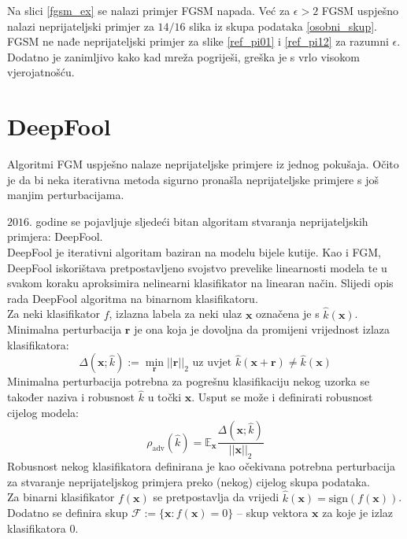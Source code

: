 \documentclass[utf8, diplomski]{fer}
\begin{document}
Na slici \ref{fgsm_ex} se nalazi primjer FGSM napada. Već za $\epsilon > 2$ FGSM uspješno nalazi neprijateljski primjer za $14/16$ slika iz skupa podataka \ref{osobni_skup}. FGSM ne nađe neprijateljski primjer za slike \ref{ref_pi01} i \ref{ref_pi12} za razumni $\epsilon$. Dodatno je zanimljivo kako kad mreža pogriješi, greška je s vrlo visokom vjerojatnošću. \\
\section{DeepFool}
Algoritmi FGM uspješno nalaze neprijateljske primjere iz jednog pokušaja. Očito je da bi neka iterativna metoda sigurno pronašla neprijateljske primjere s još manjim perturbacijama.
\par
$2016.$ godine se pojavljuje sljedeći bitan algoritam stvaranja neprijateljskih primjera: DeepFool.\\
DeepFool je iterativni algoritam baziran na modelu bijele kutije. Kao i FGM, DeepFool iskorištava pretpostavljeno svojstvo prevelike linearnosti modela te u svakom koraku aproksimira nelinearni klasifikator na linearan način. Slijedi opis rada DeepFool algoritma na binarnom klasifikatoru. \\
Za neki klasifikator $f$, izlazna labela za neki ulaz $\boldsymbol{x}$ označena je s $\hat{k}(\boldsymbol{x})$. Minimalna perturbacija $\boldsymbol{r}$ je ona koja je dovoljna da promijeni vrijednost izlaza klasifikatora:
\begin{equation}
	\Delta (\boldsymbol{x}; \hat{k}) := \mathop{\min}_{\boldsymbol{r}} ||\boldsymbol{r}||_{2} \text{ uz uvjet } \hat{k}(\boldsymbol{x}+\boldsymbol{r}) \neq \hat{k}(\boldsymbol{x})
\end{equation}
Minimalna perturbacija potrebna za pogrešnu klasifikaciju nekog uzorka se također naziva i robusnost $\hat{k}$ u točki $\boldsymbol{x}$. Usput se može i definirati robusnost cijelog modela:
\begin{equation}
	\rho_{\text{adv}}(\hat{k}) = \mathbb{E}_{\boldsymbol{x}} \frac{\Delta (\boldsymbol{x}; \hat{k})}{||\boldsymbol{x}||_{2}} 
\end{equation}
Robusnost nekog klasifikatora definirana je kao očekivana potrebna perturbacija za stvaranje neprijateljskog primjera preko (nekog) cijelog skupa podataka. \\
Za binarni klasifikator $f(\boldsymbol{x})$ se pretpostavlja da vrijedi $\hat{k}(\boldsymbol{x}) = \text{sign}(f(\boldsymbol{x}))$. Dodatno se definira skup $\mathscr{F} := \{\boldsymbol{x} : f(\boldsymbol{x}) = 0\}$ -- skup vektora $\boldsymbol{x}$ za koje je izlaz klasifikatora $0$. \\
\end{document}
